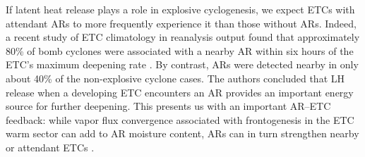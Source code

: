 \documentclass[letterpaper,12pt]{article}
\begin{document}
If latent heat release plays a role in explosive cyclogenesis, we expect ETCs with attendant ARs to more frequently experience it than those without ARs. Indeed, a recent study of ETC climatology in reanalysis output found that approximately 80\% of bomb cyclones were associated with a nearby AR within six hours of the ETC's maximum deepening rate \cite{Eiras-Barca2018TheBasins}. By contrast, ARs were detected nearby in only about 40\% of the non-explosive cyclone cases. The authors concluded that LH release when a developing ETC encounters an AR provides an important energy source for further deepening. This presents us with an important AR--ETC feedback: while vapor flux convergence associated with frontogenesis in the ETC warm sector can add to AR moisture content, ARs can in turn strengthen nearby or attendant ETCs \cite{Eiras-Barca2018TheBasins}.






\end{document}
